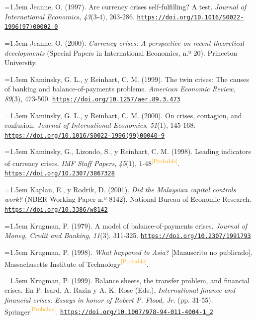 \documentclass[10pt,a4paper]{article}
\begin{document}
\noindent\hangindent=1.5em Jeanne, O. (1997). Are currency crises self-fulfilling? A test. \textit{Journal of International Economics}, \textit{43}(3-4), 263-286. \href{https://doi.org/10.1016/S0022-1996(97)00002-0}{\nolinkurl{https://doi.org/10.1016/S0022-1996(97)00002-0}}

\noindent\hangindent=1.5em Jeanne, O. (2000). \textit{Currency crises: A perspective on recent theoretical developments} (Special Papers in International Economics, n.º 20). Princeton University.

\noindent\hangindent=1.5em Kaminsky, G. L., y Reinhart, C. M. (1999). The twin crises: The causes of banking and balance-of-payments problems. \textit{American Economic Review}, \textit{89}(3), 473-500. \href{https://doi.org/10.1257/aer.89.3.473}{\nolinkurl{https://doi.org/10.1257/aer.89.3.473}}

\noindent\hangindent=1.5em Kaminsky, G. L., y Reinhart, C. M. (2000). On crises, contagion, and confusion. \textit{Journal of International Economics}, \textit{51}(1), 145-168. \href{https://doi.org/10.1016/S0022-1996(99)00040-9}{\nolinkurl{https://doi.org/10.1016/S0022-1996(99)00040-9}}

\noindent\hangindent=1.5em Kaminsky, G., Lizondo, S., y Reinhart, C. M. (1998). Leading indicators of currency crises. \textit{IMF Staff Papers}, \textit{45}(1), 1-48\textcolor{orange}{\textsuperscript{[Probable]}}. \href{https://doi.org/10.2307/3867328}{\nolinkurl{https://doi.org/10.2307/3867328}}

\noindent\hangindent=1.5em Kaplan, E., y Rodrik, D. (2001). \textit{Did the Malaysian capital controls work?} (NBER Working Paper n.º 8142). National Bureau of Economic Research. \href{https://doi.org/10.3386/w8142}{\nolinkurl{https://doi.org/10.3386/w8142}}

\noindent\hangindent=1.5em Krugman, P. (1979). A model of balance-of-payments crises. \textit{Journal of Money, Credit and Banking}, \textit{11}(3), 311-325. \href{https://doi.org/10.2307/1991793}{\nolinkurl{https://doi.org/10.2307/1991793}}

\noindent\hangindent=1.5em Krugman, P. (1998). \textit{What happened to Asia?} [Manuscrito no publicado]. Massachusetts Institute of Technology\textcolor{orange}{\textsuperscript{[Probable]}}.

\noindent\hangindent=1.5em Krugman, P. (1999). Balance sheets, the transfer problem, and financial crises. En P. Isard, A. Razin y A. K. Rose (Eds.), \textit{International finance and financial crises: Essays in honor of Robert P. Flood, Jr.} (pp. 31-55). Springer\textcolor{orange}{\textsuperscript{[Probable]}}. \href{https://doi.org/10.1007/978-94-011-4004-1_2}{\nolinkurl{https://doi.org/10.1007/978-94-011-4004-1_2}}
\end{document}
